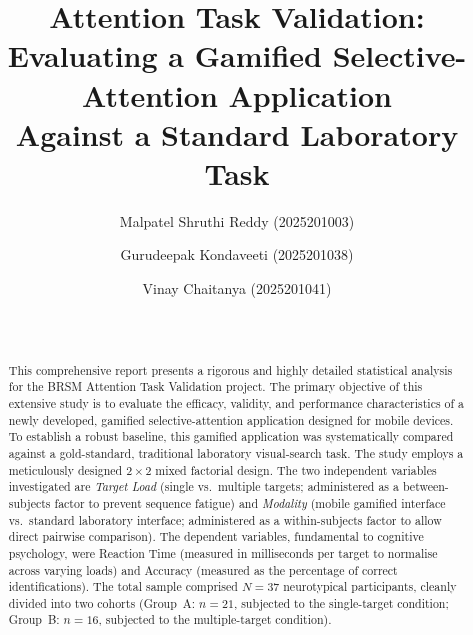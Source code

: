 \documentclass[11pt,a4paper]{article}
\title{\textbf{Attention Task Validation:\\Evaluating a Gamified Selective-Attention Application\\Against a Standard Laboratory Task}}
\author{
Malpatel Shruthi Reddy (2025201003) \\
\and
Gurudeepak Kondaveeti (2025201038) \\
\and
Vinay Chaitanya (2025201041) \\
\multicolumn{3}{c}{\vspace{0.2cm}} \\
\multicolumn{3}{c}{\textbf{Team SVG}} \\
\multicolumn{3}{c}{\url{https://github.com/gurukondaveeti/BRSM_Project.git}}
}
\date{}
\begin{document}
\sloppy
\maketitle

\begin{abstract}
This comprehensive report presents a rigorous and highly detailed statistical analysis for the BRSM Attention Task Validation project. The primary objective of this extensive study is to evaluate the efficacy, validity, and performance characteristics of a newly developed, gamified selective-attention application designed for mobile devices. To establish a robust baseline, this gamified application was systematically compared against a gold-standard, traditional laboratory visual-search task. The study employs a meticulously designed $2 \times 2$ mixed factorial design. The two independent variables investigated are \textit{Target Load} (single vs.\ multiple targets; administered as a between-subjects factor to prevent sequence fatigue) and \textit{Modality} (mobile gamified interface vs.\ standard laboratory interface; administered as a within-subjects factor to allow direct pairwise comparison). The dependent variables, fundamental to cognitive psychology, were Reaction Time (measured in milliseconds per target to normalise across varying loads) and Accuracy (measured as the percentage of correct identifications). The total sample comprised $N = 37$ neurotypical participants, cleanly divided into two cohorts (Group~A: $n = 21$, subjected to the single-target condition; Group~B: $n = 16$, subjected to the multiple-target condition). 


\end{abstract}
\end{document}
